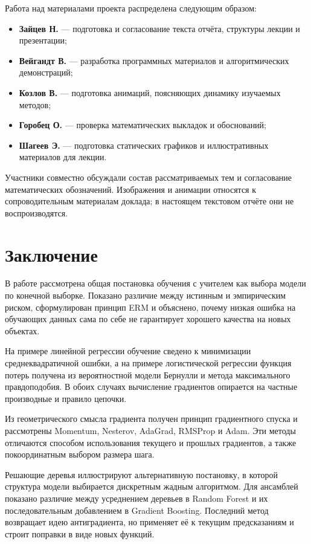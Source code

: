 \documentclass[12pt,a4paper]{article}
\begin{document}
Работа над материалами проекта распределена следующим образом:
\begin{itemize}
    \item \textbf{Зайцев Н.} --- подготовка и согласование текста отчёта,
    структуры лекции и презентации;
    \item \textbf{Вейгандт В.} --- разработка программных материалов
    и алгоритмических демонстраций;
    \item \textbf{Козлов В.} --- подготовка анимаций, поясняющих
    динамику изучаемых методов;
    \item \textbf{Горобец О.} --- проверка математических выкладок
    и обоснований;
    \item \textbf{Шагеев Э.} --- подготовка статических
    графиков и иллюстративных материалов для лекции.
\end{itemize}

Участники совместно обсуждали состав рассматриваемых тем
и согласование математических обозначений. Изображения
и анимации относятся к сопроводительным материалам доклада;
в настоящем текстовом отчёте они не воспроизводятся.

\section*{Заключение}

В работе рассмотрена общая постановка обучения с учителем
как выбора модели по конечной выборке. Показано различие
между истинным и эмпирическим риском, сформулирован принцип
ERM и объяснено, почему низкая ошибка на обучающих данных
сама по себе не гарантирует хорошего качества на новых объектах.

На примере линейной регрессии обучение сведено к минимизации
среднеквадратичной ошибки, а на примере логистической регрессии
функция потерь получена из вероятностной модели Бернулли
и метода максимального правдоподобия. В обоих случаях
вычисление градиентов опирается на частные производные
и правило цепочки.

Из геометрического смысла градиента получен принцип
градиентного спуска и рассмотрены Momentum, Nesterov,
AdaGrad, RMSProp и Adam. Эти методы отличаются способом
использования текущего и прошлых градиентов,
а также покоординатным выбором размера шага.

Решающие деревья иллюстрируют альтернативную постановку,
в которой структура модели выбирается дискретным жадным
алгоритмом. Для ансамблей показано различие между
усреднением деревьев в Random Forest и их последовательным
добавлением в Gradient Boosting. Последний метод возвращает
идею антиградиента, но применяет её к текущим предсказаниям
и строит поправки в виде новых функций.
\end{document}
